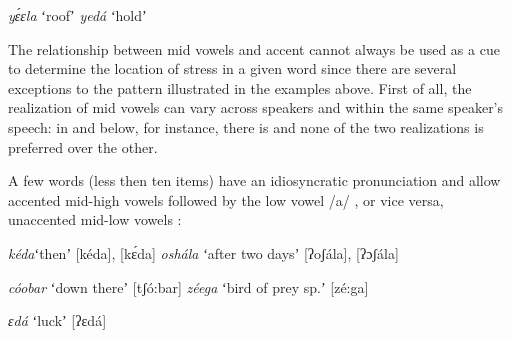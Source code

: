 \documentclass[output=paper,modfonts,nonflat,hidelinks]{langsci/langscibook}
\begin{document}
\begin{exe}
\ex \begin{xlist}
    \ex \textit{yɛ́ɛla}\hspace{10mm} ʻroofʼ \label{ex:Petrollino:roof}
    \ex \textit{yedá}\hspace{11mm} ʻholdʼ \label{ex:Petrollino:hold}
\end{xlist}
\end{exe}
The relationship between mid vowels and accent cannot always be used as a cue to determine the location of stress in a given word since there are several exceptions to the pattern illustrated in the examples above. First of all, the realization of mid vowels can vary across speakers and within the same speaker's speech: in  and  below, for instance, there is  and none of the two realizations is preferred over the other. 

A few words (less then ten items) have an idiosyncratic pronunciation and allow accented mid-high vowels followed by the low vowel /a/ , or vice versa, unaccented mid-low vowels :

\begin{exe}
	\ex \begin{xlist}
	\ex \textit{kéda}\hspace{8mm}ʻthenʼ\hspace{19mm} [kéda], [kɛ́da] \label{ex:Petrollino:keda}
    \ex \textit{oshála}\hspace{5mm} ʻafter two daysʼ\hspace{3mm} [ʔoʃála], [ʔɔʃála] \label{ex:Petrollino:oshala}
    \end{xlist}
\end{exe}

\begin{exe}
	\ex \begin{xlist} \label{ex:Petrollino:coobar} 
    \ex \textit{cóobar}\hspace{5mm} ʻdown thereʼ\hspace{7mm} [tʃó:bar] 
    \ex \textit{zéega}\hspace{7mm} ʻbird of prey sp.ʼ \hspace{1mm}[zé:ga] 
    \end{xlist}
\end{exe}
    
\begin{exe}
    \ex \textit{ɛdá}\hspace{17mm} ʻluckʼ\hspace{18mm} [ʔɛdá] \label{ex:Petrollino:ɛda}
\end{exe}
\end{document}
